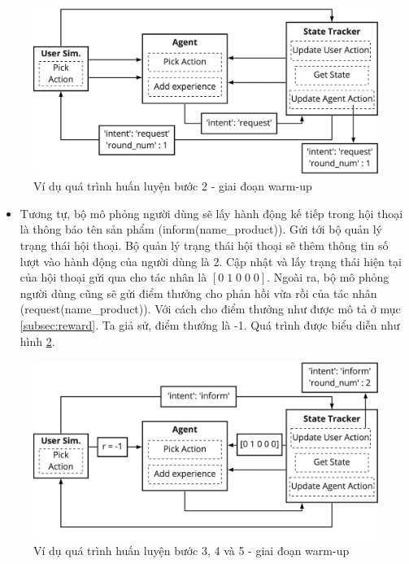\begin{center}
    \begin{figure}[h!]
        \begin{center}
         \includegraphics[scale=0.15]{chapter4/img/warmup_exam1.jpeg}
        \end{center}
        \caption{Ví dụ quá trình huấn luyện bước 2 - giai đoạn warm-up}
        \label{fig:examwarmup1}
    \end{figure}
\end{center}

\begin{itemize}
    \item Tương tự, bộ mô phỏng người dùng sẽ lấy hành động kế tiếp trong hội thoại là thông báo tên sản phẩm (inform(name\_product)). Gửi tới bộ quản lý trạng thái hội thoại. Bộ quản lý trạng thái hội thoại sẽ thêm thông tin số lượt vào hành động của người dùng là 2. Cập nhật và lấy trạng thái hiện tại của hội thoại gửi qua cho tác nhân là $[0\; 1\; 0\; 0\; 0]$. Ngoài ra, bộ mô phỏng người dùng cũng sẽ gửi điểm thưởng cho phản hồi vừa rồi của tác nhân (request(name\_product)). Với cách cho điểm thưởng như được mô tả ở mục \ref{subsec:reward}. Ta giả sử, điểm thưởng là -1. Quá trình được biểu diễn như hình \ref{fig:examwarmup2}.
\end{itemize}

\begin{center}
    \begin{figure}[h!]
        \begin{center}
         \includegraphics[scale=0.15]{chapter4/img/warmup_exam2.jpg}
        \end{center}
        \caption{Ví dụ quá trình huấn luyện bước 3, 4 và 5 - giai đoạn warm-up}
        \label{fig:examwarmup2}
    \end{figure}
\end{center}

